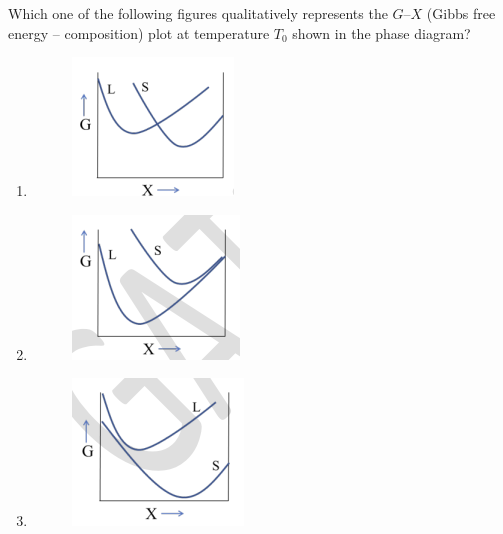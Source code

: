 \documentclass[12pt]{article}
\begin{document}
\begin{enumerate}
Which one of the following figures qualitatively represents the $G$--$X$ (Gibbs free energy -- composition) plot at temperature $T_0$ shown in the phase diagram?

\begin{enumerate}
\item \begin{figure}[H]
    \centering
    \includegraphics[width=0.5\columnwidth]{figs/ass5_c_q53_a.png}
    \caption{}
    \label{fig:placeholder}
\end{figure}
\item \begin{figure}[H]
    \centering
    \includegraphics[width=0.5\columnwidth]{figs/ass5_c_q53_b.png}
    \caption{}
    \label{fig:placeholder}
\end{figure}
\item \begin{figure}[H]
    \centering
    \includegraphics[width=0.5\columnwidth]{figs/ass5_c_q53_c.png}

\end{figure}
\end{enumerate}
\end{enumerate}
\end{document}

